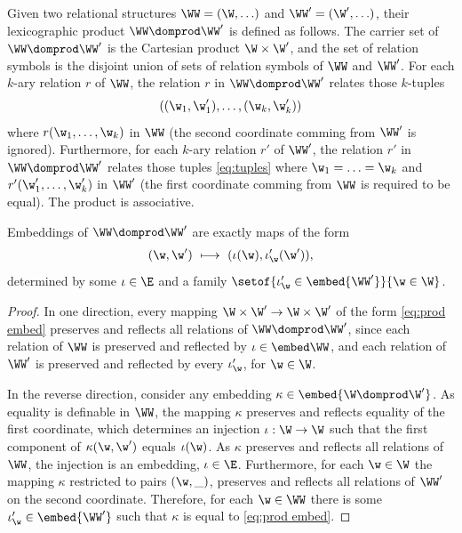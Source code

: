 Given two relational structures $\WW = (\W, \ldots)$ and $\WW' = (\W', \ldots)$, 
their lexicographic product
$\WW \domprod \WW'$ is defined
as follows.
The carrier set of $\WW \domprod \WW'$ is the Cartesian product $\W\times\W'$,
and the set of relation symbols is the disjoint union of sets of relation symbols of $\WW$ and $\WW'$.
For each $k$-ary relation $r$ of $\WW$, the relation $r$ in $\WW \domprod \WW'$ 
relates those $k$-tuples
\begin{align}\label{eq:tuples}
((\w_1, \w'_1), \ldots, (\w_k, \w'_k))
\end{align}
where $r(\w_1, \ldots, \w_k)$ in $\WW$ (the second coordinate comming from $\WW'$ is ignored). 
Furthermore, 
for each $k$-ary relation $r'$ of $\WW'$, the relation $r'$ in $\WW \domprod \WW'$ relates those tuples
\eqref{eq:tuples}
where $\w_1 = \ldots = \w_k$ and $r'(\w'_1, \ldots, \w'_k)$ in $\WW'$
(the first coordinate comming from $\WW$ is required to be equal).
The product is associative.
%

\begin{lemmarep}\label{lem:prod embed}
Embeddings of $\WW \domprod \WW'$ are exactly maps of the form
\begin{align} \label{eq:prod embed}
(\w, \w') \ \longmapsto \ (\iota(\w), \iota'_{\w}(\w')),
\end{align}
determined by some $\iota\in\E$ and
a family $\setof{\iota'_{\w}\in\embed{\WW'}}{\w\in\W}$.

\end{lemmarep}
%
\begin{proof}
In one direction, every mapping $\W\times\W' \to \W\times\W'$ of the form \eqref{eq:prod embed}
preserves and reflects all relations of $\WW\domprod\WW'$, since each relation of $\WW$ is
preserved and reflected by $\iota\in\embed \WW$, and each relation of $\WW'$ is preserved
and reflected by every $\iota'_\w$, for $\w\in\W$.

In the reverse direction, consider any embedding $\kappa \in \embed{\W\domprod\W'}$.
As equality is definable in $\WW$, the mapping $\kappa$ preserves and reflects equality of the first coordinate, which determines an injection $\iota: \W\to\W$
such that the first component of $\kappa(\w,\w')$ equals $\iota(\w)$.
As $\kappa$ preserves and reflects all relations of $\WW$, the injection is an embedding,
$\iota\in\E$.
Furthermore, for each $\w\in\W$ the mapping $\kappa$ restricted to pairs $(\w, \_)$,
preserves and reflects all relations of $\WW'$ on the second coordinate.
Therefore, for each $\w\in\WW$ there is some $\iota'_\w\in\embed{\WW'}$ such that $\kappa$ is equal to
\eqref{eq:prod embed}.
\end{proof}


